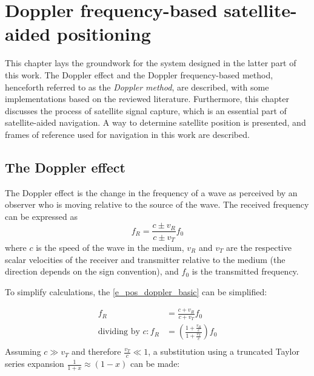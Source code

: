 \chapter{Doppler frequency-based satellite-aided positioning}
\label{s_pos}
This chapter lays the groundwork for the system designed in the latter part of this work. The Doppler effect and the Doppler frequency-based method, henceforth referred to as the \textit{Doppler method}, are described, with some implementations based on the reviewed literature. Furthermore, this chapter discusses the process of satellite signal capture, which is an essential part of satellite-aided navigation. A way to determine satellite position is presented, and frames of reference used for navigation in this work are described. 



\section{The Doppler effect}
The Doppler effect is the change in the frequency of a wave as perceived by an observer who is moving relative to the source of the wave. The received frequency can be expressed as
\begin{equation}
    \label{e_pos_doppler_basic}
    f_R = \frac{c \pm v_R}{c \pm v_T} f_0
\end{equation}
 where $c$ is the speed of the wave in the medium, $v_R$ and $v_T$ are the respective scalar velocities of the receiver and transmitter relative to the medium (the direction depends on the sign convention), and $f_0$ is the transmitted frequency. 

To simplify calculations, the \autoref{e_pos_doppler_basic} can be simplified:

\begin{align*}
    f_R &= \frac{c + v_R}{c + v_T} f_0 \\
    \text{dividing by } c: f_R & = (\frac{1 + \frac{v_R}{c}}{1 + \frac{v_T}{c}}) f_0 \\
\end{align*}
Assuming $c \gg v_T$ and therefore $\frac{v_T}{c} \ll 1$, a substitution using a truncated Taylor series expansion $\frac{1}{1 + x} \approx (1 - x)$ can be made:

